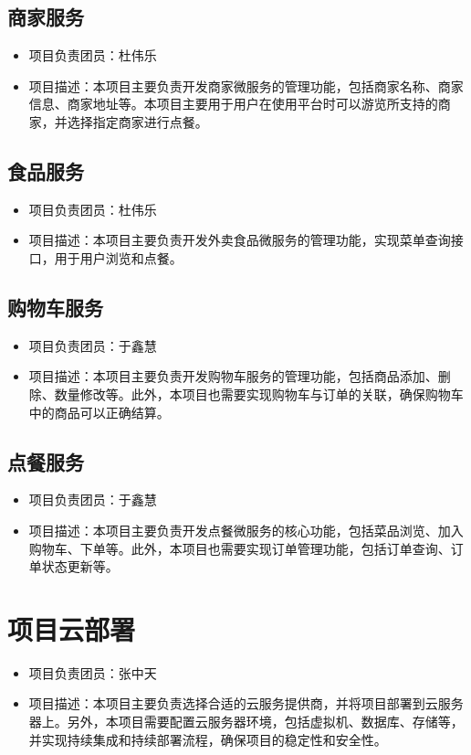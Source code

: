 \subsection{商家服务}
\begin{itemize}
    \item{项目负责团员}：杜伟乐
    \item {项目描述}：本项目主要负责开发商家微服务的管理功能，包括商家名称、商家信息、商家地址等。本项目主要用于用户在使用平台时可以游览所支持的商家，并选择指定商家进行点餐。
\end{itemize}

\subsection{食品服务}
\begin{itemize}
    \item{项目负责团员}：杜伟乐
    \item {项目描述}：本项目主要负责开发外卖食品微服务的管理功能，实现菜单查询接口，用于用户浏览和点餐。
\end{itemize}

\subsection{购物车服务}
\begin{itemize}
    \item{项目负责团员}：于鑫慧
    \item {项目描述}：本项目主要负责开发购物车服务的管理功能，包括商品添加、删除、数量修改等。此外，本项目也需要实现购物车与订单的关联，确保购物车中的商品可以正确结算。
\end{itemize}

\subsection{点餐服务}
\begin{itemize}
    \item{项目负责团员}：于鑫慧
    \item {项目描述}：本项目主要负责开发点餐微服务的核心功能，包括菜品浏览、加入购物车、下单等。此外，本项目也需要实现订单管理功能，包括订单查询、订单状态更新等。
\end{itemize}

\section{项目云部署}
\begin{itemize}
    \item{项目负责团员}：张中天
    \item{项目描述}：本项目主要负责选择合适的云服务提供商，并将项目部署到云服务器上。另外，本项目需要配置云服务器环境，包括虚拟机、数据库、存储等，并实现持续集成和持续部署流程，确保项目的稳定性和安全性。    
\end{itemize}


